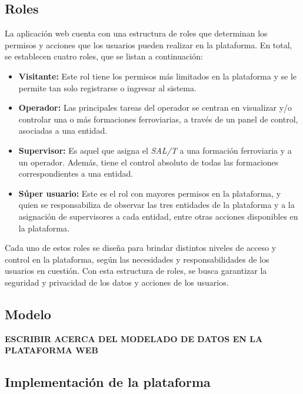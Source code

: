 \subsection{Roles}

La aplicación web cuenta con una estructura de roles que determinan los permisos y acciones que los usuarios pueden realizar en la plataforma. En total, se establecen cuatro roles, que se listan a continuación:

\begin{itemize}

  \item \textbf{Visitante:} Este rol tiene los permisos más limitados en la plataforma y se le permite tan solo registrarse o ingresar al sistema.

  \item \textbf{Operador:} Las principales tareas del operador se centran en visualizar y/o controlar una o más formaciones ferroviarias, a través de un panel de control, asociadas a una entidad.

  \item \textbf{Supervisor:} Es aquel que asigna el \textit{SAL/T} a una formación ferroviaria y a un operador. Además, tiene el control absoluto de todas las formaciones correspondientes a una entidad.

  \item \textbf{Súper usuario:} Este es el rol con mayores permisos en la plataforma, y quien se responsabiliza de observar las tres entidades de la plataforma y a la asignación de supervisores a cada entidad, entre otras acciones disponibles en la plataforma.

\end{itemize}

Cada uno de estos roles se diseña para brindar distintos niveles de acceso y control en la plataforma, según las necesidades y responsabilidades de los usuarios en cuestión. Con esta estructura de roles, se busca garantizar la seguridad y privacidad de los datos y acciones de los usuarios.


\subsection{Modelo}


\textbf{ESCRIBIR ACERCA DEL MODELADO DE DATOS EN LA PLATAFORMA WEB}


\subsection{Implementación de la plataforma}

